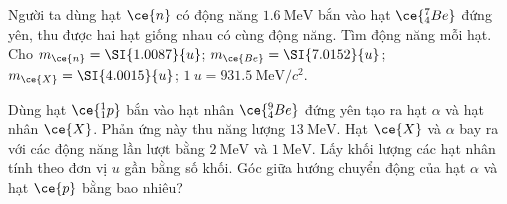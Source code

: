 \begin{ex}
	Người ta dùng hạt $\ce{n}$ có động năng $\SI{1.6}{\mega\electronvolt}$ bắn vào hạt $\ce{^7_4Be}$ đứng yên, thu được hai hạt giống nhau có cùng động năng. Tìm động năng mỗi hạt.\\
	Cho $m_{\ce{n}}=\SI{1.0087}{u}$; $m_{\ce{Be}}=\SI{7.0152}{u}$; $m_{\ce{X}}=\SI{4.0015}{u}$; $\SI{1}{u}=\SI{931.5}{\mega\electronvolt/c^2}$.
\end{ex}
\begin{ex}
	Dùng hạt $\ce{^1_1p}$ bắn vào hạt nhân $\ce{^9_4Be}$ đứng yên tạo ra hạt $\alpha$ và hạt nhân $\ce{X}$. Phản ứng này thu năng lượng $\SI{13}{\mega\electronvolt}$. Hạt $\ce{X}$ và $\alpha$ bay ra với các động năng lần lượt bằng $\SI{2}{\mega\electronvolt}$ và $\SI{1}{\mega\electronvolt}$. Lấy khối lượng các hạt nhân tính theo đơn vị $\si{u}$ gần bằng số khối. Góc giữa hướng chuyển động của hạt $\alpha$ và hạt $\ce{p}$ bằng bao nhiêu?
\end{ex}
